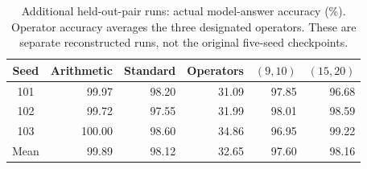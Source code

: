 \begin{table}[!htbp]
\centering\revisioncolor\small
\setlength{\tabcolsep}{5pt}
\caption{Additional held-out-pair runs: actual model-answer accuracy (\%). Operator accuracy averages the three designated operators. These are separate reconstructed runs, not the original five-seed checkpoints.}
\label{tab:heldout-accuracy}
\begin{tabular}{@{}crrrrr@{}}
\toprule
Seed & Arithmetic & Standard & Operators & $(9,10)$ & $(15,20)$ \\
\midrule
101 & 99.97 & 98.20 & 31.09 & 97.85 & 96.68 \\
102 & 99.72 & 97.55 & 31.99 & 98.01 & 98.59 \\
103 & 100.00 & 98.60 & 34.86 & 96.95 & 99.22 \\
\midrule Mean & 99.89 & 98.12 & 32.65 & 97.60 & 98.16 \\
\bottomrule
\end{tabular}
\end{table}

